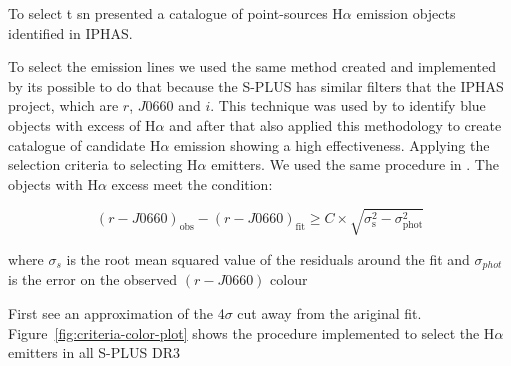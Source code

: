\documentclass[fleqn,usenatbib]{mnras}
\begin{document}
To select t sn
\citet{Witham:2008} presented a catalogue of point-sources H{$\alpha$}
emission objects identified in IPHAS. 

To select the emission lines we used the same method created and
implemented by \citet{Witham:2008} its possible to do that because
the S-PLUS has similar filters that the IPHAS project, which are
$r$, $J$0660 and $i$. This technique was used by \citet{Scaringi:2013}
to identify blue objects with excess of H{$\alpha$} and after that
\citet{Wevers:2017} also applied this methodology to create catalogue
of candidate H{$\alpha$} emission showing a high effectiveness.    
Applying the selection criteria to selecting H$\alpha$ emitters.
We used the same procedure in  \citet{Wevers:2017}. The objects
with H$\alpha$ excess meet the condition:


\begin{equation}
  (r - J0660)_{\mathrm{obs}} - (r - J0660)_{\mathrm{fit}} \geq C \times \sqrt{\sigma^2_{\mathrm{s}} - \sigma^2_{\mathrm{phot}}}
\end{equation}
 
 
where $\sigma_s$ is the root mean squared value of the residuals around
the fit and $\sigma_{phot}$ is the error on the observed $(r - J0660)$ colour

First see an approximation of the  4$\sigma$ cut away from the ariginal fit.
Figure~\ref{fig:criteria-color-plot} shows the procedure implemented
to select the H{$\alpha$} emitters in all S-PLUS DR3 
\end{document}
